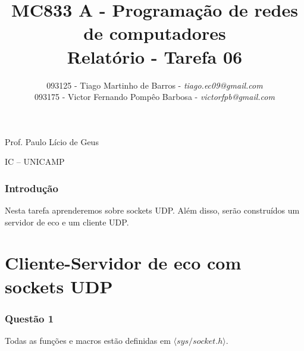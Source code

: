 \documentclass[a4paper,10pt]{article}
\begin{document}


\title{MC833 A - Programação de redes de computadores\\
Relatório - Tarefa 06}

\author {   093125 - Tiago Martinho de Barros - \textit{tiago.ec09@gmail.com}\\
            093175 - Victor Fernando Pompêo Barbosa - \textit{victorfpb@gmail.com}}


\maketitle

\centerline{Prof. Paulo Lício de Geus}
\centerline{IC -- UNICAMP}

\vspace{2cm}
\tableofcontents
    
\newpage
\section*{Introdução}
\hspace{14pt}

    Nesta tarefa aprenderemos sobre sockets UDP. Além disso, serão construídos um servidor de eco e um cliente UDP. 

\renewcommand\thepart{\Alph{part}}
\part{Cliente-Servidor de eco com sockets UDP}
\section{Questão 1}

Todas as funções e macros estão definidas em $\langle sys/socket.h \rangle$.
\end{document}
